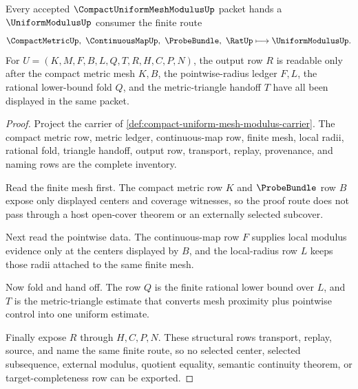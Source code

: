 \begin{theorem}
\label{thm:compact-uniform-mesh-modulus-finite-net-handoff}
Every accepted $\CompactUniformMeshModulusUp$ packet hands a $\UniformModulusUp$ consumer the finite route
$$
\CompactMetricUp,\ \ContinuousMapUp,\ \ProbeBundle,\ \RatUp
\longmapsto
\UniformModulusUp .
$$
For $U=(K,M,F,B,L,Q,T,R,H,C,P,N)$, the output row $R$ is readable only after the compact metric mesh $K,B$, the pointwise-radius ledger $F,L$, the rational lower-bound fold $Q$, and the metric-triangle handoff $T$ have all been displayed in the same packet.
\end{theorem}
\begin{proof}
Project the carrier of \autoref{def:compact-uniform-mesh-modulus-carrier}. The compact metric row, metric ledger, continuous-map row, finite mesh, local radii, rational fold, triangle handoff, output row, transport, replay, provenance, and naming rows are the complete inventory.

Read the finite mesh first. The compact metric row $K$ and $\ProbeBundle$ row $B$ expose only displayed centers and coverage witnesses, so the proof route does not pass through a host open-cover theorem or an externally selected subcover.

Next read the pointwise data. The continuous-map row $F$ supplies local modulus evidence only at the centers displayed by $B$, and the local-radius row $L$ keeps those radii attached to the same finite mesh.

Now fold and hand off. The row $Q$ is the finite rational lower bound over $L$, and $T$ is the metric-triangle estimate that converts mesh proximity plus pointwise control into one uniform estimate.

Finally expose $R$ through $H,C,P,N$. These structural rows transport, replay, source, and name the same finite route, so no selected center, selected subsequence, external modulus, quotient equality, semantic continuity theorem, or target-completeness row can be exported.
\end{proof}

